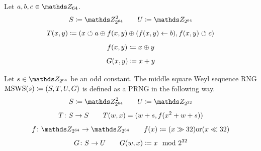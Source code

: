 \documentclass{stdlocal}
\begin{document}
    \begin{definition}[Xoroshiro128+]
      Let $a,b,c \in \setInteger_{64}$.
      \[
        S \define \setInteger_{2^{64}}^2
        \separate
        U \define \setInteger_{2^{64}}
      \]
      \[
        T(x,y) \coloneqq (x \circlearrowleft a \oplus f(x,y) \oplus (f(x,y) \leftarrow b), f(x,y) \circlearrowleft c)
      \]
      \[
        f(x,y) \coloneqq x \oplus y
      \]
      \[
        G(x,y) \coloneqq x + y
      \]
    \end{definition}

    \begin{definition}
      Let $s\in\setInteger_{2^{64}}$ be an odd constant.
      The middle square Weyl sequence RNG $\mathrm{MSWS}(s)\coloneqq(S,T,U,G)$ is defined as a PRNG in the following way.
      \[
        S \define \setInteger_{2^{64}}^2
        \separate
        U \define \setInteger_{2^{32}}
      \]
      \[
        T\colon S\to S
        \qquad
        T(w,x) = (w+s, f(x^2 + w + s))
      \]
      \[
        \function{f}{\setInteger_{2^{64}}}{\setInteger_{2^{64}}}
        \separate
        f(x) \define (x \gg 32) \mathrm{or} (x \ll 32)
      \]
      \[
        G\colon S\to U
        \qquad
        G(w,x) \coloneqq x \mod 2^{32}
      \]
    \end{definition}
\end{document}
